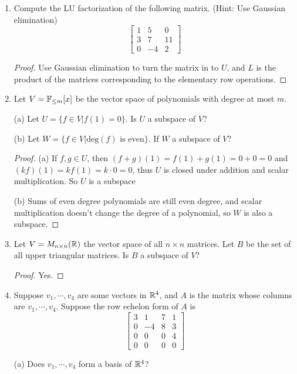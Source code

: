 \documentclass{amsart}
\begin{document}
	
\vspace{2em}

\begin{enumerate}
\item Compute the LU factorization of the following matrix. (Hint: Use Gaussian elimination)
\[\begin{bmatrix}
	1&5&0\\3&7&11\\0&-4&2
\end{bmatrix}\]
\begin{proof}{\color{blue}
	Use Gaussian elimination to turn the matrix in to $U$, and $L$ is the product of the matrices corresponding to the elementary row operations.}
\end{proof}
\item Let $V=\mathbb{F}_{\leq m}[x]$ be the vector space of polynomials with degree at most $m$. 

(a) Let $U=\{f\in V|f(1)=0\}$. Is $U$ a subspace of $V$?

(b) Let $W=\{f\in V| \text{deg}(f)\text{ is even}\}$. If $W$ a subspace of $V$?
\begin{proof}\color{blue}
	(a) If $f,g\in U$, then $(f+g)(1)=f(1)+g(1)=0+0=0$ and $(kf)(1)=kf(1)=k\cdot 0 =0$, thus $U$ is closed under addition and scalar multiplication. So $U$ is a subspace
	
	(b) Sums of even degree polynomials are still even degree, and scalar multiplication doesn't change the degree of a polynomial, so $W$ is also a subspace.
\end{proof}
\item Let $V=M_{n\times n}(\mathbb{R})$ the vector space of all $n\times n$ matrices. Let $B$ be the set of all upper triangular matrices. Is $B$ a subspace of $V$?
\begin{proof}
	\color{blue} Yes.
\end{proof}
\item Suppose $v_1,\cdots,v_4$ are some vectors in $\mathbb{R}^4$, and $A$ is the matrix whose columns are $v_1,\cdots,v_4$. Suppose the row echelon form of $A$ is
\[\begin{bmatrix}
	3&1&7&1\\0&-4&8&3\\0&0&0&4\\0&0&0&0
\end{bmatrix}\]

(a) Does $v_1,\cdots,v_4$ form a basis of $\mathbb{R}^4$?


\end{enumerate}
\end{document}
